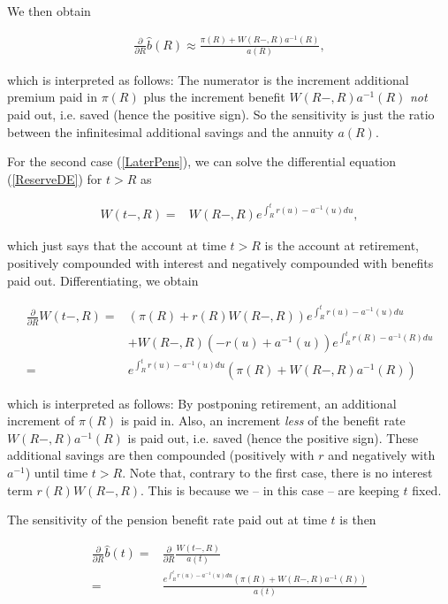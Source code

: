 \documentclass{book}
\newcommand{\1}[1]{\mathbbm{1}_{\left\lbrace #1 \right\rbrace}}
\theoremstyle{break}
\theoremstyle{remark}
\numberwithin{equation}{section}
\begin{document}
We then obtain

\begin{align*}
	\frac{\partial}{\partial R} \hat{b}(R) \approx \frac{\pi(R) + W(R-,R) a^{-1}(R)}{a(R)},
\end{align*}

which is interpreted as follows: The numerator is the increment additional premium paid in $\pi(R)$ plus the increment benefit $W(R-,R) a^{-1}(R)$ \textit{not} paid out, i.e. saved (hence the positive sign). So the sensitivity is just the ratio between the  infinitesimal additional savings and the annuity $a(R)$.

For the second case (\ref{LaterPens}), we can solve the differential equation (\ref{ReserveDE}) for $t>R$ as

\begin{align} \label{ReserveAfterRetirement}
	W(t-,R) =& W(R-,R) e^{\int_R^t r(u) - a^{-1}(u) du},
\end{align}

which just says that the account at time $t>R$ is the account at retirement, positively compounded with interest and negatively compounded with benefits paid out. Differentiating, we obtain

\begin{align*}
	\frac{\partial}{\partial R} W(t-,R) =& \left( \pi(R) + r(R) W(R-,R) \right) e^{\int_R^t r(u) - a^{-1}(u) du} \\
	&+ W(R-,R) \left( - r(u) + a^{-1}(u) \right) e^{\int_R^t r(R) - a^{-1}(R) du} \\
	=& e^{\int_R^t r(u) - a^{-1}(u) du} \left( \pi (R) + W(R-,R) a^{-1}(R) \right)
\end{align*}

which is interpreted as follows: By postponing retirement, an additional increment of $\pi(R)$ is paid in. Also, an increment \textit{less} of the benefit rate $W(R-,R) a^{-1}(R)$ is paid out, i.e. saved (hence the positive sign). These additional savings are then compounded (positively with $r$ and negatively with $a^{-1}$) until time $t>R$. Note that, contrary to the first case, there is no interest term $r(R)W(R-,R)$. This is because we -- in this case -- are keeping $t$ fixed.

The sensitivity of the pension benefit rate paid out at time $t$ is then

\begin{align*}
	\frac{\partial}{\partial R} \hat{b}(t) =& \frac{\partial}{\partial R} \frac{W(t-,R)}{a(t)} \\ =& \frac{e^{\int_R^t r(u) - a^{-1}(u) du} \left( \pi (R) + W(R-,R) a^{-1}(R) \right)}{a(t)}
\end{align*}
\end{document}
